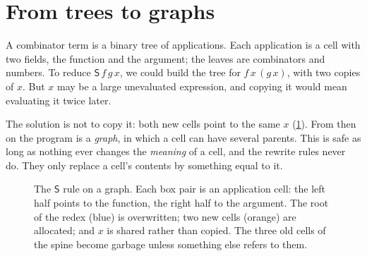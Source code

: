 \documentclass[11pt,a4paper]{article}
\newcommand{\cmb}[1]{\textsf{#1}}
\newcommand{\Sc}{\cmb{S}}
\newcommand{\gcell}[5][half]{%
  \node[#1, anchor=east] (#2-f) at (#3) {#4};
  \node[#1, anchor=west] (#2-a) at (#3) {#5};}
\theoremstyle{definition}
\theoremstyle{plain}
\begin{document}
\section{From trees to graphs}\label{sec:graphs}

A combinator term is a binary tree of applications. Each application is a
cell with two fields, the function and the argument; the leaves are
combinators and numbers. To reduce $\Sc\,f\,g\,x$, we could build the tree for
$f\,x\,(g\,x)$, with two copies of $x$. But $x$ may be a large unevaluated
expression, and copying it would mean evaluating it twice later.

The solution is not to copy it: both new cells point to the same $x$
(\cref{fig:srule}). From then on the program is a \emph{graph}, in which a
cell can have several parents. This is safe as long as nothing ever changes
the \emph{meaning} of a cell, and the rewrite rules never do. They only
replace a cell's contents by something equal to it.

\begin{figure}[t]
\centering
{}
\caption{The $\Sc$ rule on a graph. Each box pair is an application cell: the
left half points to the function, the right half to the argument. The root
of the redex (blue) is overwritten; two new cells (orange) are allocated; and
$x$ is shared rather than copied. The three old cells of the spine become
garbage unless something else refers to them.}
\label{fig:srule}
\end{figure}
\end{document}
